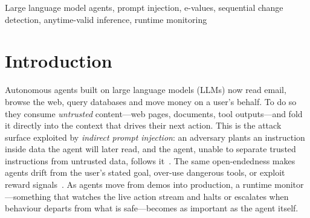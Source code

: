 \documentclass[10pt,journal,compsoc]{IEEEtran}
\theoremstyle{plain}
\theoremstyle{definition}
\begin{document}
{\begin{abstract}
ablation---including three signals we implemented and \emph{rejected} because
they did not separate on our data. A generalisation study shows the method
transfers cleanly to a second, unrelated agent (GPT-4o-mini, AUROC \(0.82\)) but
that the shipped signal is attack-specific: it detects imperative-style
injections near-perfectly yet fails on InjecAgent's data-integration payloads
(AUROC \(0.47\)), a boundary we report and explain rather than hide.
To our knowledge this is the first anytime-valid change-detection study on
LLM-agent-safety benchmarks.
\end{abstract}
\begin{IEEEkeywords}
Large language model agents, prompt injection, e-values, sequential change detection, anytime-valid inference, runtime monitoring
\end{IEEEkeywords}}

\maketitle
\IEEEdisplaynontitleabstractindextext
\IEEEpeerreviewmaketitle


\section{Introduction}\label{sec:intro}

Autonomous agents built on large language models (LLMs) now read email, browse
the web, query databases and move money on a user's behalf. To do so they
consume \emph{untrusted} content---web pages, documents, tool
outputs---and fold it directly into the context that drives their next action.
This is the attack surface exploited by \emph{indirect prompt injection}: an
adversary plants an instruction inside data the agent will later read, and the
agent, unable to separate trusted instructions from untrusted data, follows
it~\cite{zhan2024injecagent,debenedetti2024agentdojo}. The same
open-endedness makes agents drift from the user's stated goal, over-use
dangerous tools, or exploit reward
signals~\cite{belenky2026cheap,thaman2026rewardhacking}. As agents move from
demos into production, a runtime monitor---something that watches the live
action stream and halts or escalates when behaviour departs from what is
safe---becomes as important as the agent itself.
\end{document}
